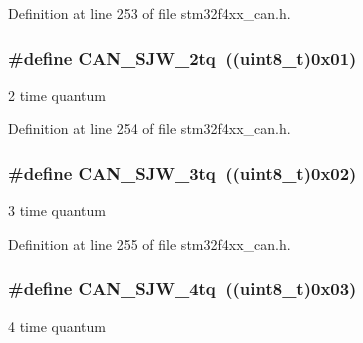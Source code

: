 Definition at line 253 of file stm32f4xx\-\_\-can.\-h.

\hypertarget{group___c_a_n__synchronisation__jump__width_gad39e7656c555cc00bc4d7c1bff39916f}{
\subsubsection[{C\-A\-N\-\_\-\-S\-J\-W\-\_\-2tq}]{\setlength{\rightskip}{0pt plus 5cm}\#define C\-A\-N\-\_\-\-S\-J\-W\-\_\-2tq~((uint8\-\_\-t)0x01)}}\label{group___c_a_n__synchronisation__jump__width_gad39e7656c555cc00bc4d7c1bff39916f}
2 time quantum 

Definition at line 254 of file stm32f4xx\-\_\-can.\-h.

\hypertarget{group___c_a_n__synchronisation__jump__width_gab4de740e2184aac71c2c8cba22a8ecd2}{
\subsubsection[{C\-A\-N\-\_\-\-S\-J\-W\-\_\-3tq}]{\setlength{\rightskip}{0pt plus 5cm}\#define C\-A\-N\-\_\-\-S\-J\-W\-\_\-3tq~((uint8\-\_\-t)0x02)}}\label{group___c_a_n__synchronisation__jump__width_gab4de740e2184aac71c2c8cba22a8ecd2}
3 time quantum 

Definition at line 255 of file stm32f4xx\-\_\-can.\-h.

\hypertarget{group___c_a_n__synchronisation__jump__width_ga7f26a36d478c7ba1a1441b369d62f693}{
\subsubsection[{C\-A\-N\-\_\-\-S\-J\-W\-\_\-4tq}]{\setlength{\rightskip}{0pt plus 5cm}\#define C\-A\-N\-\_\-\-S\-J\-W\-\_\-4tq~((uint8\-\_\-t)0x03)}}\label{group___c_a_n__synchronisation__jump__width_ga7f26a36d478c7ba1a1441b369d62f693}
4 time quantum 

